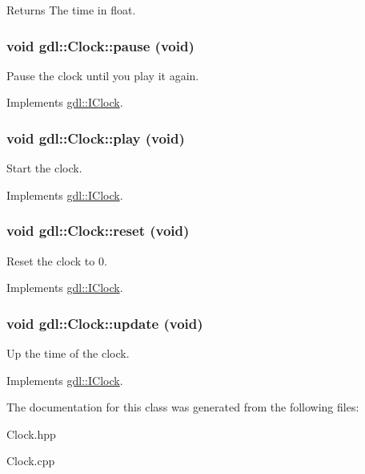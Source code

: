 \begin{DoxyReturn}{Returns}
The time in float. 
\end{DoxyReturn}
\hypertarget{classgdl_1_1Clock_afcd4590e0217065f7f2c9bd13cb6c3ad}{
\subsubsection[{pause}]{\setlength{\rightskip}{0pt plus 5cm}void gdl::Clock::pause (void)}}
\label{classgdl_1_1Clock_afcd4590e0217065f7f2c9bd13cb6c3ad}
Pause the clock until you play it again. 

Implements \hyperlink{classgdl_1_1IClock_a7274430efa1f0e621bcce5d99d6abca7}{gdl::IClock}.\hypertarget{classgdl_1_1Clock_af1054a354823d2556a780ddec710e368}{
\subsubsection[{play}]{\setlength{\rightskip}{0pt plus 5cm}void gdl::Clock::play (void)}}
\label{classgdl_1_1Clock_af1054a354823d2556a780ddec710e368}
Start the clock. 

Implements \hyperlink{classgdl_1_1IClock_af9f70e18cd6b9b39aca1a359412adf4d}{gdl::IClock}.\hypertarget{classgdl_1_1Clock_a9a44b0217d50c216d2e94d0f174e3a67}{
\subsubsection[{reset}]{\setlength{\rightskip}{0pt plus 5cm}void gdl::Clock::reset (void)}}
\label{classgdl_1_1Clock_a9a44b0217d50c216d2e94d0f174e3a67}
Reset the clock to 0. 

Implements \hyperlink{classgdl_1_1IClock_a63cd29fcd9830e719d4cb82d5e993ec6}{gdl::IClock}.\hypertarget{classgdl_1_1Clock_acc748cbe2dc79ab94c7843e2f010d049}{
\subsubsection[{update}]{\setlength{\rightskip}{0pt plus 5cm}void gdl::Clock::update (void)}}
\label{classgdl_1_1Clock_acc748cbe2dc79ab94c7843e2f010d049}
Up the time of the clock. 

Implements \hyperlink{classgdl_1_1IClock_a0489f6f9055df40116e98e7ed6ad4146}{gdl::IClock}.

The documentation for this class was generated from the following files:\begin{DoxyCompactItemize}
\item 
Clock.hpp\item 
Clock.cpp\end{DoxyCompactItemize}
